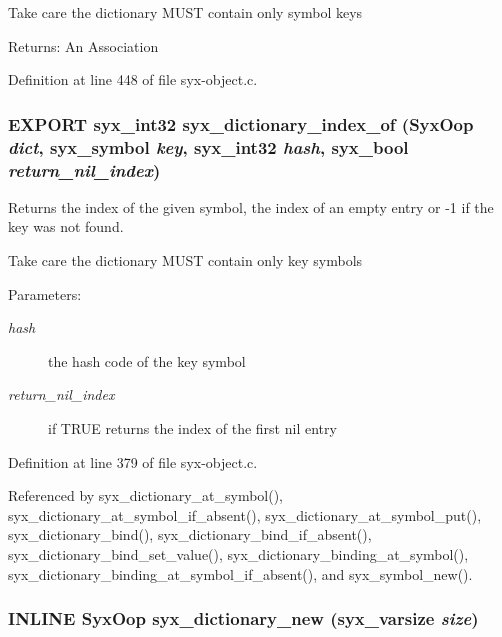 Take care the dictionary MUST contain only symbol keys

\begin{Desc}
\item[Returns:]An Association \end{Desc}


Definition at line 448 of file syx-object.c.\hypertarget{syx-object_8h_4d007f448f92d47915f0f9b03abcffea}{
\subsubsection{\setlength{\rightskip}{0pt plus 5cm}EXPORT {\bf syx\_\-int32} syx\_\-dictionary\_\-index\_\-of ({\bf SyxOop} {\em dict}, \/  {\bf syx\_\-symbol} {\em key}, \/  {\bf syx\_\-int32} {\em hash}, \/  {\bf syx\_\-bool} {\em return\_\-nil\_\-index})}}
\label{syx-object_8h_4d007f448f92d47915f0f9b03abcffea}


Returns the index of the given symbol, the index of an empty entry or -1 if the key was not found.

Take care the dictionary MUST contain only key symbols

\begin{Desc}
\item[Parameters:]
\begin{description}
\item[{\em hash}]the hash code of the key symbol \item[{\em return\_\-nil\_\-index}]if TRUE returns the index of the first nil entry \end{description}
\end{Desc}


Definition at line 379 of file syx-object.c.

Referenced by syx\_\-dictionary\_\-at\_\-symbol(), syx\_\-dictionary\_\-at\_\-symbol\_\-if\_\-absent(), syx\_\-dictionary\_\-at\_\-symbol\_\-put(), syx\_\-dictionary\_\-bind(), syx\_\-dictionary\_\-bind\_\-if\_\-absent(), syx\_\-dictionary\_\-bind\_\-set\_\-value(), syx\_\-dictionary\_\-binding\_\-at\_\-symbol(), syx\_\-dictionary\_\-binding\_\-at\_\-symbol\_\-if\_\-absent(), and syx\_\-symbol\_\-new().\hypertarget{syx-object_8h_cdaeef35d6b8e61ddf3034ecb35c827b}{
\subsubsection{\setlength{\rightskip}{0pt plus 5cm}INLINE {\bf SyxOop} syx\_\-dictionary\_\-new ({\bf syx\_\-varsize} {\em size})}}
\label{syx-object_8h_cdaeef35d6b8e61ddf3034ecb35c827b}


